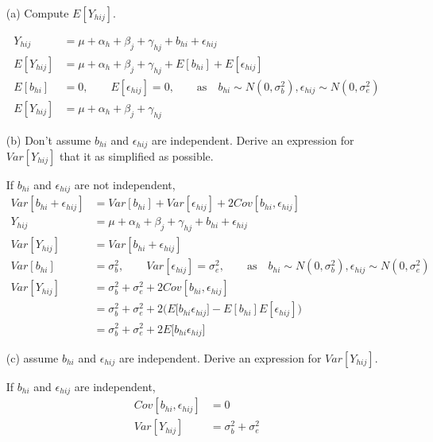 \documentclass[11pt]{article} %
\begin{document}
\begin{itemize}
\item[(a)] Compute $E[Y_{hij}]$.
	
	\begin{align*}
		Y_{hij} &= \mu + \alpha_h + \beta_j + \gamma_{hj} + b_{hi} + \epsilon_{hij} \\
		E[Y_{hij}] &= \mu + \alpha_h + \beta_j + \gamma_{hj} + E[b_{hi}] + E[\epsilon_{hij}] \\
		 E[b_{hi}] &= 0, \qquad E[\epsilon_{hij}] = 0, \qquad \text{as} \quad b_{hi} \sim N(0, \sigma^2_b), \epsilon_{hij} \sim N(0, \sigma^2_e) \\
		E[Y_{hij}] &= \mu + \alpha_h + \beta_j + \gamma_{hj} 
	\end{align*}

\item[(b)] Don't assume $b_{hi}$ and $\epsilon_{hij}$ are independent. Derive an expression for $Var[Y_{hij}]$ that it as simplified as possible.

If $b_{hi}$ and $\epsilon_{hij}$ are not independent,
\begin{align*}
	Var[b_{hi} + \epsilon_{hij}] &= Var[b_{hi}] + Var[\epsilon_{hij}] +2 Cov[b_{hi}, \epsilon_{hij}] \\
	Y_{hij} &= \mu + \alpha_h + \beta_j + \gamma_{hj} + b_{hi} + \epsilon_{hij} \\
	Var[Y_{hij}] &= Var[b_{hi} + \epsilon_{hij}] \\
	Var[b_{hi}] &= \sigma^2_b, \qquad Var[\epsilon_{hij}] = \sigma^2_e, \qquad \text{as} \quad b_{hi} \sim N(0, \sigma^2_b), \epsilon_{hij} \sim N(0, \sigma^2_e) \\
	Var[Y_{hij}] &= \sigma^2_b + \sigma^2_e + 2 Cov[b_{hi}, \epsilon_{hij}] \\
	&=  \sigma^2_b + \sigma^2_e + 2 \Bigg( E \Big[ b_{hi} \epsilon_{hij} \Big] - E[b_{hi} ] E[\epsilon_{hij}] \Bigg) \\
	&= \sigma^2_b + \sigma^2_e + 2 E \Big[ b_{hi} \epsilon_{hij} \Big] 
\end{align*}

\item[(c)] assume $b_{hi}$ and $\epsilon_{hij}$ are independent. Derive an expression for $Var[Y_{hij}]$. 

If $b_{hi}$ and $\epsilon_{hij}$ are independent,
\begin{align*}
	Cov[b_{hi}, \epsilon_{hij}] &= 0\\
	Var[Y_{hij}] &= \sigma^2_b + \sigma^2_e
\end{align*}

\end{itemize}
\end{document}
